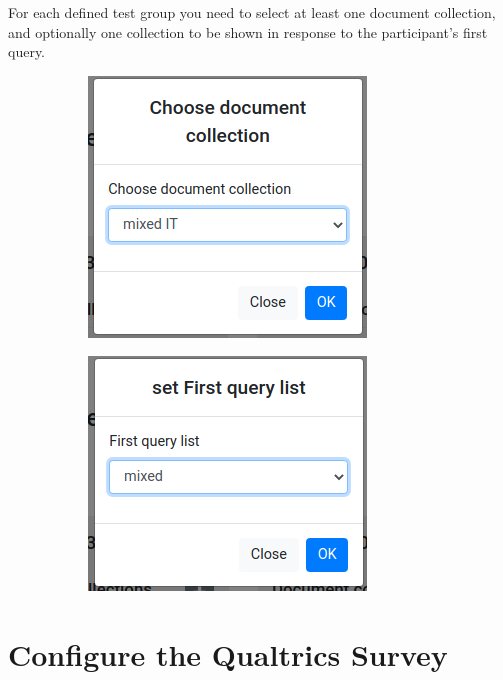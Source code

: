 \documentclass[fleqn]{article}
\begin{document}
For each defined test group you need to select at least one document collection, and optionally
one collection to be shown in response to the participant's first query.

\begin{figure}[h]
     \centering
     \begin{subfigure}[b]{0.4\textwidth}
         \centering
         \includegraphics[width=.7\linewidth]{img/groups2}
     \end{subfigure}
     \begin{subfigure}[b]{0.4\textwidth}
         \centering
         \includegraphics[width=.8\linewidth]{img/groups3}
     \end{subfigure}
\end{figure}

\newpage

\section{Configure the Qualtrics Survey}
\end{document}

